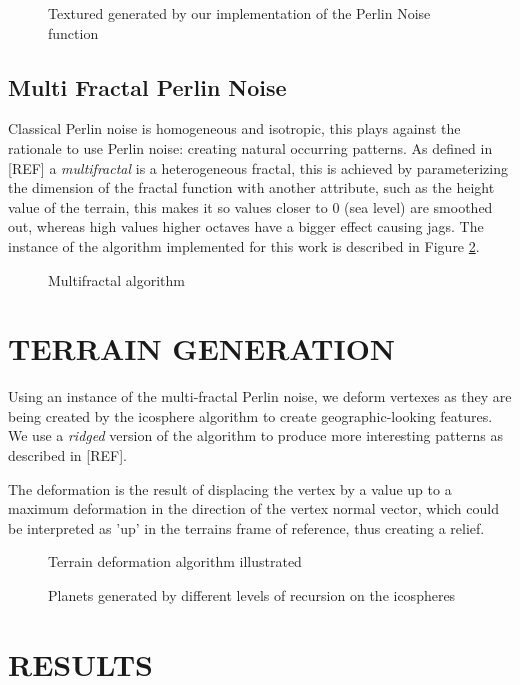 \documentclass[a4paper,twoside]{article}
\begin{document}
\begin{figure}
\caption{Textured generated by our implementation of the Perlin Noise function}
\label{fig_pn}
\end{figure}

\subsection{Multi Fractal Perlin Noise}
\label{sec:mfpnois}
Classical Perlin noise is homogeneous and isotropic, this plays against the rationale to use Perlin noise: creating natural occurring patterns.  As defined in [REF] a \textit{multifractal} is a heterogeneous fractal, this is achieved by parameterizing the dimension of the fractal function with another attribute, such as the height value of the terrain, this makes it so values closer to 0 (sea level) are smoothed out, whereas high values higher octaves have a bigger effect causing jags. The instance of the algorithm implemented for this work is described in Figure \ref{fig_mf}.

\begin{figure}
\caption{Multifractal algorithm}
\label{fig_mf}
\end{figure}

\section{\uppercase{Terrain Generation}}
\label{sec:tgeneration}

\noindent Using an instance of the multi-fractal Perlin noise, we deform vertexes as they are being created by the icosphere algorithm to create geographic-looking features. We use a \textit{ridged} version of the algorithm to produce more interesting patterns as described in [REF].

The deformation is the result of displacing the vertex by a value up to a maximum deformation in the direction of the vertex normal vector, which could be interpreted as 'up' in the terrains frame of reference, thus creating a relief.

\begin{figure}
\caption{Terrain deformation algorithm illustrated}
\label{fig_tda}
\end{figure}

\begin{figure}
\caption{Planets generated by different levels of recursion on the icospheres}
\label{fig_iterations}
\end{figure}

\section{\uppercase{Results}}
\label{sec:results}

\vfill
\end{document}
